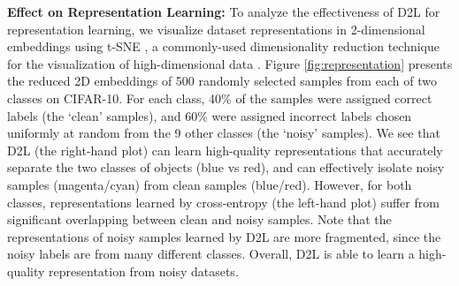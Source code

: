 \documentclass{article}
\begin{document}

\textbf{Effect on Representation Learning:}
\label{sec:regularization}
To analyze the effectiveness of D2L for representation learning, we visualize dataset representations in 2-dimensional embeddings using t-SNE \cite{maaten2008visualizing}, a commonly-used dimensionality reduction technique for the visualization of high-dimensional data \cite{lecun2015deep}. Figure \ref{fig:representation} presents the reduced 2D embeddings of 500 randomly selected samples from each of two classes on CIFAR-10. For each class, 40\% of the samples were assigned correct labels (the `clean' samples), and 60\% were assigned incorrect labels chosen uniformly at random from the 9 other classes (the `noisy' samples). We see that D2L (the right-hand plot) can learn high-quality representations that accurately separate the two classes of objects (blue vs red), and can effectively isolate noisy samples (magenta/cyan) from clean samples (blue/red). However, for both classes, representations learned by cross-entropy (the left-hand plot) suffer from significant overlapping between clean and noisy samples. Note that the representations of noisy samples learned by D2L are more fragmented, since the noisy labels are from many different classes. Overall, D2L is able to learn a high-quality representation from noisy datasets.
\end{document}
